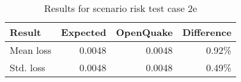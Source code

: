\begin{table}[htbp]

\centering
\begin{tabular}{ l r r r }

\hline
\rowcolor{anti-flashwhite}
\bf{Result} & \bf{Expected} & \bf{OpenQuake} & \bf{Difference}\\
\hline
Mean loss & 0.0048 & 0.0048 & 0.92\% \\
Std. loss & 0.0048 & 0.0048 & 0.49\% \\
\hline
\end{tabular}

\caption{Results for scenario risk test case 2e}
\label{tab:result-scenario-risk-2e}
\end{table}